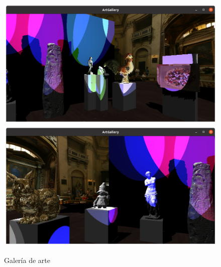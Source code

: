 \documentclass[12pt]{article}
\begin{document}
{\begin{figure}[H]
\centering
\includegraphics[scale=0.5]{images/der.png}
\includegraphics[scale=0.5]{images/izq.png}
\caption{Galería de arte}
\end{figure}

}
\end{document}

